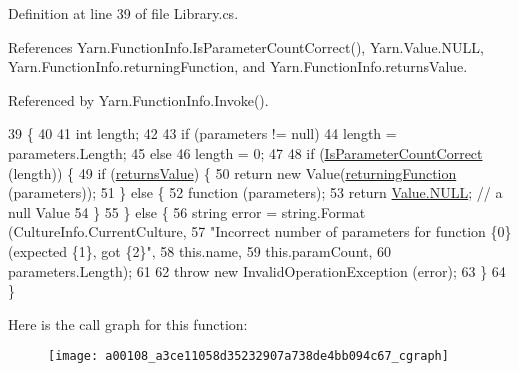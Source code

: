 Definition at line 39 of file Library.\-cs.



References Yarn.\-Function\-Info.\-Is\-Parameter\-Count\-Correct(), Yarn.\-Value.\-N\-U\-L\-L, Yarn.\-Function\-Info.\-returning\-Function, and Yarn.\-Function\-Info.\-returns\-Value.



Referenced by Yarn.\-Function\-Info.\-Invoke().


\begin{DoxyCode}
39                                                          \{
40 
41             \textcolor{keywordtype}{int} length;
42 
43             \textcolor{keywordflow}{if} (parameters != null)
44                 length = parameters.Length;
45             \textcolor{keywordflow}{else}
46                 length = 0;
47 
48             \textcolor{keywordflow}{if} (\hyperlink{a00108_a1ed09ff8aafa230a0d2bbc23cd6cd763}{IsParameterCountCorrect} (length)) \{
49                 \textcolor{keywordflow}{if} (\hyperlink{a00108_acaff044276aa230de7c0b27dd5267bc7}{returnsValue}) \{
50                     \textcolor{keywordflow}{return} \textcolor{keyword}{new} Value(\hyperlink{a00108_a8b6e0e5a875c427a1d947f3c52c308ca}{returningFunction} (parameters));
51                 \} \textcolor{keywordflow}{else} \{
52                     \textcolor{keyword}{function} (parameters);
53                     \textcolor{keywordflow}{return} \hyperlink{a00189_a1ed2964965baca8621c45efa23f37660}{Value.NULL}; \textcolor{comment}{// a null Value}
54                 \}
55             \} \textcolor{keywordflow}{else} \{
56                 \textcolor{keywordtype}{string} error = string.Format (CultureInfo.CurrentCulture,
57                     \textcolor{stringliteral}{"Incorrect number of parameters for function \{0\} (expected \{1\}, got \{2\}"},
58                     this.name,
59                     this.paramCount,
60                     parameters.Length);
61 
62                 \textcolor{keywordflow}{throw} \textcolor{keyword}{new} InvalidOperationException (error);
63             \}
64         \}
\end{DoxyCode}


Here is the call graph for this function\-:
\nopagebreak
\begin{figure}[H]
\begin{center}
\leavevmode
\texttt{[image: a00108\_a3ce11058d35232907a738de4bb094c67\_cgraph]}
\end{center}
\end{figure}





